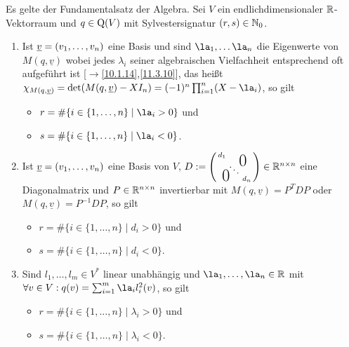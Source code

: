 \documentclass[../../main.tex]{subfiles}
\begin{document}
\begin{sat}\label{14.1.2}
    Es gelte der Fundamentalsatz der Algebra. Sei $V$ ein endlichdimensionaler $\mathbb R$-Vektorraum und $q\in \operatorname{Q}(V)$ mit Sylvestersignatur $(r,s)\in \mathbb N_0$.
    \begin{enumerate}[\normalfont(a)]
        \item Ist ${\underline v}=(v_1,\ldots ,v_n)$ eine Basis und sind $\la_1,\ldots \la_n$ die Eigenwerte von $M(q,\underline{v})$ wobei jedes $\lambda_i$ seiner algebraischen Vielfachheit entsprechend oft aufgeführt ist [$\to$\ref{10.1.14},\ref{11.3.10}], das heißt $\chi_{M(q,\underline{v})}=\det(M(q,\v)-XI_n)=(-1)^n\prod_{i=1}^n(X - \la_i)$, so gilt
        \begin{itemize}
            \item $r=\#\{i\in \{1,\ldots ,n\}\mid \la_i>0\}$ und
            \item $s=\#\{i\in \{1,\ldots ,n\}\mid \la_i<0\}$.
        \end{itemize}
        \item Ist ${\underline v}=(v_1,\ldots ,v_n)$ eine Basis von $V$, $D:=\left(\begin{smallmatrix}
            d_1 & & \llap{$\overset{\blap{\LARGE 0}}{~}$} \\
            & \ddots &\\
            \rlap{\tlap{\LARGE 0}} & & d_n\end{smallmatrix}
        \right)\in \R^{n\times n}$ eine Diagonalmatrix und $P\in \mathbb R^{n\times n}$ invertierbar mit $M(q,\underline{v})=P^TDP$ oder $M(q,\underline{v})=P^{-1}DP$, so gilt
        \begin{itemize}
            \item $r=\#\{i\in \{1,\ldots ,n\}\mid d_i>0\}$ und
            \item $s=\#\{i\in \{1,\ldots ,n\}\mid d_i<0\}$.
        \end{itemize}
        \item Sind $l_1,\ldots ,l_m\in V^*$ linear unabhängig und $\la_1,\ldots ,\la_n\in \R$ mit $\forall v\in V: q(v)=\sum_{i=1}^m\la_il_i^2(v)$, so gilt
        \begin{itemize}
            \item $r=\#\{i\in \{1,\ldots ,n\}\mid \lambda_i>0\}$ und
            \item $s=\#\{i\in \{1,\ldots ,n\}\mid \lambda_i<0\}$.
        \end{itemize}
    \end{enumerate}
\end{sat}
\end{document}
